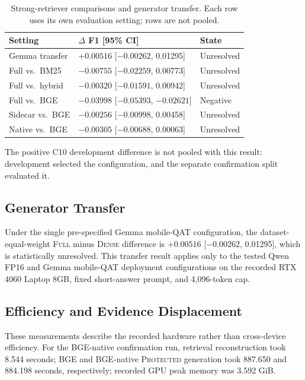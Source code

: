 \documentclass[11pt]{article}
\newcommand{\full}{\textsc{Full}\xspace}
\newcommand{\dense}{\textsc{Dense}\xspace}
\newcommand{\prot}{\textsc{Protected}\xspace}
\begin{document}
\begin{table}[t]
\centering
\scriptsize
\setlength{\tabcolsep}{2.2pt}
\begin{tabular}{@{}lll@{}}
\toprule
Setting & $\Delta$ F1 [95\% CI] & State \\
\midrule
Gemma transfer & $+0.00516$ [$-0.00262$, 0.01295] & Unresolved \\
Full vs.\ BM25 & $-0.00755$ [$-0.02259$, 0.00773] & Unresolved \\
Full vs.\ hybrid & $-0.00320$ [$-0.01591$, 0.00942] & Unresolved \\
Full vs.\ BGE & $-0.03998$ [$-0.05393$, $-0.02621$] & Negative \\
Sidecar vs.\ BGE & $-0.00256$ [$-0.00998$, 0.00458] & Unresolved \\
Native vs.\ BGE & $-0.00305$ [$-0.00688$, 0.00063] & Unresolved \\
\bottomrule
\end{tabular}
\caption{Strong-retriever comparisons and generator transfer. Each row uses
its own evaluation setting; rows are not pooled.}
\label{tab:strong}
\end{table}

The positive C10 development difference is not pooled with this result:
development selected the configuration, and the separate confirmation split
evaluated it.

\subsection{Generator Transfer}

Under the single pre-specified Gemma mobile-QAT configuration, the
dataset-equal-weight \full minus \dense difference is
$+0.00516$ [$-0.00262$, 0.01295], which is statistically unresolved. This
transfer result applies only to the tested Qwen FP16 and Gemma mobile-QAT
deployment configurations on the recorded RTX 4060 Laptop 8GB, fixed
short-answer prompt, and 4,096-token cap.

\subsection{Efficiency and Evidence Displacement}

These measurements describe the recorded hardware rather than cross-device
efficiency. For the BGE-native confirmation run, retrieval
reconstruction took 8.544 seconds; BGE and BGE-native \prot generation took
887.650 and
884.198 seconds, respectively; recorded GPU peak memory was 3.592 GiB.
\end{document}
